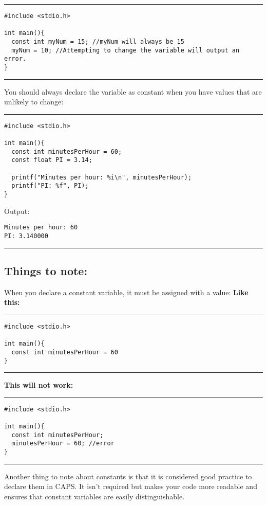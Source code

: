 \documentclass[a4paper]{article}
\begin{document}
\noindent\rule{\textwidth}{0.5pt}
\begin{verbatim}
#include <stdio.h>

int main(){
  const int myNum = 15; //myNum will always be 15
  myNum = 10; //Attempting to change the variable will output an error.
}
\end{verbatim}

\noindent\rule{\textwidth}{0.5pt}

You should always declare the variable as constant when you have values that are
unlikely to change:

\noindent\rule{\textwidth}{0.5pt}
\begin{verbatim}
#include <stdio.h>

int main(){
  const int minutesPerHour = 60;
  const float PI = 3.14;

  printf("Minutes per hour: %i\n", minutesPerHour);
  printf("PI: %f", PI);
}
\end{verbatim}
Output:
\begin{verbatim}
Minutes per hour: 60
PI: 3.140000
\end{verbatim}

\noindent\rule{\textwidth}{0.5pt}

\subsection{Things to note:}
\label{sec:orge00c8d9}
When you declare a constant variable, it must be assigned with a value:
\textbf{Like this:}

\noindent\rule{\textwidth}{0.5pt}
\begin{verbatim}
#include <stdio.h>

int main(){
  const int minutesPerHour = 60
}
\end{verbatim}

\noindent\rule{\textwidth}{0.5pt}
\textbf{This will not work:}

\noindent\rule{\textwidth}{0.5pt}
\begin{verbatim}
#include <stdio.h>

int main(){
  const int minutesPerHour;
  minutesPerHour = 60; //error
}
\end{verbatim}

\noindent\rule{\textwidth}{0.5pt}
Another thing to note about constants is that it is considered good practice to
declare them in CAPS. It isn't required but makes your code more readable and
ensures that constant variables are easily distinguishable.
\end{document}
